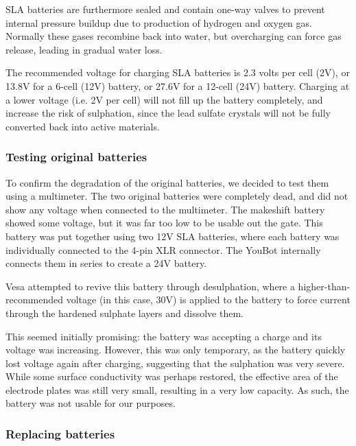 \documentclass[a4paper, 12pt]{article}
\newif\ifshownotes
\newcommand{\notes}[1]{\ifshownotes\textcolor{blue}{#1}\fi}
\begin{document}
    SLA batteries are furthermore sealed and contain one-way valves to prevent internal pressure buildup due to production of hydrogen and oxygen gas. Normally these gases recombine back into water, but overcharging can force gas release, leading in gradual water loss. 

    The recommended voltage for charging SLA batteries is 2.3 volts per cell (2V), or 13.8V for a 6-cell (12V) battery, or 27.6V for a 12-cell (24V) battery. Charging at a lower voltage (i.e. 2V per cell) will not fill up the battery completely, and increase the risk of sulphation, since the lead sulfate crystals will not be fully converted back into active materials. 

    \subsubsection{Testing original batteries}

    To confirm the degradation of the original batteries, we decided to test them using a multimeter. The two original batteries were completely dead, and did not show any voltage when connected to the multimeter. The makeshift battery showed some voltage, but it was far too low to be usable out the gate. This battery was put together using two 12V SLA batteries, where each battery was individually connected to the 4-pin XLR connector. The YouBot internally connects them in series to create a 24V battery.   
    
    Vesa attempted to revive this battery through desulphation, where a higher-than-recommended voltage (in this case, 30V) is applied to the battery to force current through the hardened sulphate layers and dissolve them. 

    This seemed initially promising: the battery was accepting a charge and its voltage was increasing. However, this was only temporary, as the battery quickly lost voltage again after charging, suggesting that the sulphation was very severe. While some surface conductivity was perhaps restored, the effective area of the electrode plates was still very small, resulting in a very low capacity. As such, the battery was not usable for our purposes.  

    \subsubsection{Replacing batteries}

    \notes{maybe here we can link to the specific batteries used? the dimensions would be neat as well...}
\end{document}
